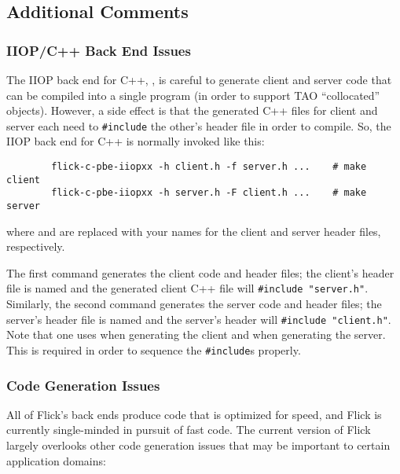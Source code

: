 

\subsection{Additional Comments}
\label{subsec:BE:Additional Comments}

\subsubsection{IIOP/C++ Back End Issues}
\label{subsubsec:BE:IIOP/C++ Back End Issues}

The IIOP back end for C++, , is careful to generate
client and server code that can be compiled into a single program (in order to
support TAO ``collocated'' objects).  However, a side effect is that the
generated C++ files for client and server each need to \texttt{\#include} the
other's header file in order to compile.  So, the IIOP back end for C++ is
normally invoked like this:

\begin{verbatim}
        flick-c-pbe-iiopxx -h client.h -f server.h ...    # make client
        flick-c-pbe-iiopxx -h server.h -F client.h ...    # make server
\end{verbatim}

\noindent where  and  are replaced with
your names for the client and server header files, respectively.

The first command generates the client code and header files; the client's
header file is named  and the generated client C++ file will
\texttt{\#include~"server.h"}.  Similarly, the second command generates the
server code and header files; the server's header file is named
 and the server's header will \texttt{\#include~"client.h"}.
Note that one uses  when generating the client and  when
generating the server.  This is required in order to sequence the
\texttt{\#include}s properly.

\subsubsection{Code Generation Issues}
\label{subsubsec:BE:Code Generation Issues}

All of Flick's back ends produce code that is optimized for speed, and Flick is
currently single-minded in pursuit of fast code.  The current version of Flick
largely overlooks other code generation issues that may be important to certain
application domains:

